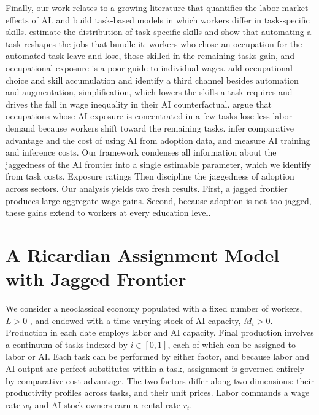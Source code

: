 \documentclass[11pt]{article}
\begin{document}
Finally, our work relates to a growing literature that quantifies
the labor market effects of AI. \citet{fm2026} and \citet{althoffreichardt2026}
build task-based models in which workers differ in task-specific skills.
\citet{fm2026} estimate the distribution of task-specific skills
and show that automating a task reshapes the jobs that bundle it:
workers who chose an occupation for the automated task leave and lose,
those skilled in the remaining tasks gain, and occupational exposure
is a poor guide to individual wages. \citet{althoffreichardt2026}
add occupational choice and skill accumulation and identify a third
channel besides automation and augmentation, simplification, which
lowers the skills a task requires and drives the fall in wage inequality
in their AI counterfactual. \citet{hpss2025} argue that occupations
whose AI exposure is concentrated in a few tasks lose less labor demand
because workers shift toward the remaining tasks. \citet{lorv2026}
infer comparative advantage and the cost of using AI from adoption
data, and \citet{llqt2026} measure AI training and inference costs.
Our framework condenses all information about the jaggedness of the
AI frontier into a single estimable parameter, which we identify from
task costs. Exposure ratings \citep{emmr2024} Then discipline the
jaggedness of adoption across sectors. Our analysis yields two fresh
results. First, a jagged frontier produces large aggregate wage gains.
Second, because adoption is not too jagged, these gains extend to
workers at every education level.

\section{A Ricardian Assignment Model with Jagged Frontier}\label{sec:model}

We consider a neoclassical economy populated with a fixed number of
workers, $L>0$ , and endowed with a time-varying stock of AI capacity,
$M_{t}>0$. Production in each date employs labor and AI capacity.
Final production involves a continuum of tasks indexed by $i\in[0,1]$,
each of which can be assigned to labor or AI. Each task can be performed
by either factor, and because labor and AI output are perfect substitutes
within a task, assignment is governed entirely by comparative cost
advantage. The two factors differ along two dimensions: their productivity
profiles across tasks, and their unit prices. Labor commands a wage
rate $w_{t}$ and AI stock owners earn a rental rate $r_{t}$.
\end{document}
